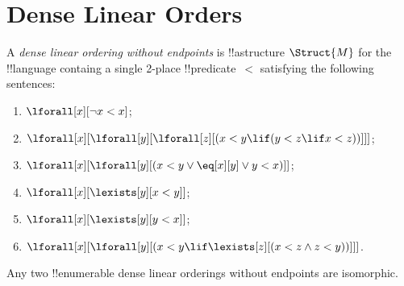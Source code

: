 \documentclass[../../../include/open-logic-section]{subfiles}
\begin{document}
\section{Dense Linear Orders}

\begin{defn}
  A \emph{dense linear ordering without endpoints} is !!a{structure}
  $\Struct{M}$ for the !!{language} containg a single 2-place
  !!{predicate}~$<$ satisfying the following sentences:
  \begin{enumerate}
  \item $\lforall[x][\lnot x < x]$;
  \item $\lforall[x][\lforall[y][\lforall[z][(x < y \lif (y < z \lif x
    <z ))]]]$;
  \item $\lforall[x][\lforall[y][(x< y \lor \eq[x][y] \lor y < x)]]$;
  \item $\lforall[x][\lexists[y][x < y]]$;
  \item $\lforall[x][\lexists[y][y < x]]$;
  \item $\lforall[x][\lforall[y][(x < y \lif \lexists[z][(x < z \land
        z < y))]]]$.
 \end{enumerate}
\end{defn}

\begin{thm}
  Any two !!{enumerable} dense linear orderings without
  endpoints are isomorphic.
\end{thm}
\end{document}
